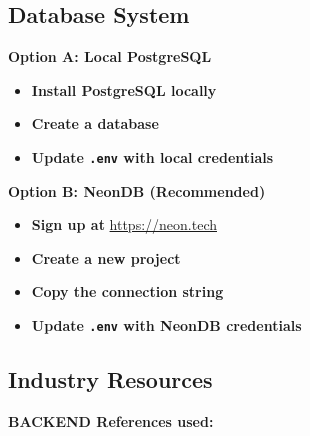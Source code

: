 \subsection{Database System}
\textbf{Option A: Local PostgreSQL}
\begin{itemize}
    \item \textbf{Install PostgreSQL locally}
    \item \textbf{Create a database}
    \item \textbf{Update \texttt{.env} with local credentials}
\end{itemize}

\textbf{Option B: NeonDB (Recommended)}
\begin{itemize}
    \item \textbf{Sign up at} \url{https://neon.tech}
    \item \textbf{Create a new project}
    \item \textbf{Copy the connection string}
    \item \textbf{Update \texttt{.env} with NeonDB credentials}
\end{itemize}


\subsection{Industry Resources}
\textbf{BACKEND References used:}

